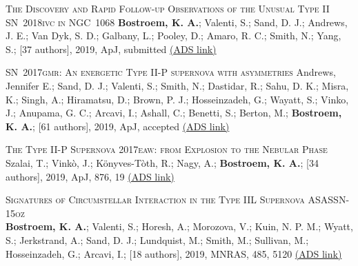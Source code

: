 
\vspace{-0.1in}  
\begin{revnumerate}[14]
\item{\textsc{The Discovery and Rapid Follow-up Observations of the Unusual Type II SN~2018ivc in NGC~1068}
{\bf Bostroem, K. A.}; Valenti, S.; Sand, D. J.; Andrews, J. E.; Van Dyk, S. D.; Galbany, L.; Pooley, D.; Amaro, R. C.; Smith, N.; Yang, S.; [37 authors], 2019, ApJ, submitted 
\color{blue}\href{https://ui.adsabs.harvard.edu/abs/2019arXiv190907304B/abstract}{(ADS link)}\color{black}}\\

\item{\textsc{SN~2017gmr: An energetic Type II-P supernova with asymmetries}
Andrews, Jennifer E.; Sand, D. J.; Valenti, S.; Smith, N.; Dastidar, R.; Sahu, D. K.; Misra, K.; Singh, A.; Hiramatsu, D.; Brown, P. J.; Hosseinzadeh, G.; Wayatt, S.; Vinko, J.; Anupama, G. C.; Arcavi, I.; Ashall, C.; Benetti, S.; Berton, M.; \textbf{Bostroem, K. A.}; [61 authors], 2019, ApJ, accepted
\color{blue}\href{https://ui.adsabs.harvard.edu/abs/2019arXiv190701013A/abstract} {(ADS link)}\color{black}}\\

\item{\textsc{The Type II-P Supernova 2017eaw: from Explosion to the Nebular Phase}\\ 
Szalai, T.; Vink\`{o}, J.; K\"{o}nyves-T\`{o}th, R.; Nagy, A.; {\bf Bostroem, K. A.}; [34 authors], 2019, ApJ, 876, 19
\color{blue}\href{https://ui.adsabs.harvard.edu/abs/2019ApJ...876...19S/abstract}{(ADS link)}\color{black}}\\

\item{\textsc{Signatures of Circumstellar Interaction in the Type IIL Supernova ASASSN-15oz}\\ 
{\bf Bostroem, K. A.}; Valenti, S.; Horesh, A.; Morozova, V.; Kuin, N. P. M.; Wyatt, S.; Jerkstrand, A.; Sand, D. J.; Lundquist, M.; Smith, M.; Sullivan, M.; Hosseinzadeh, G.; Arcavi, I.;  [18 authors], 2019, MNRAS, 485, 5120
\color{blue}\href{https://ui.adsabs.harvard.edu/abs/2019MNRAS.485.5120B/abstract}{(ADS link)}\color{black}}\\


\end{revnumerate}
